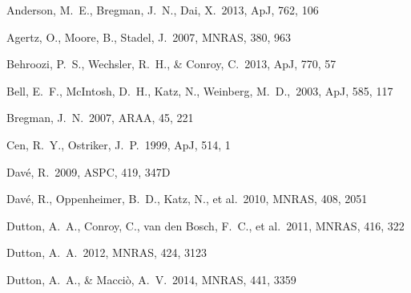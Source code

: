 \documentclass[useAMS,usenatbib]{mn2e}
\def \apj {ApJ}
\def \mnras {MNRAS}
\begin{document}
\begin{thebibliography}{}


 Anderson, M.~E., Bregman, J.~N., Dai, X.\ 2013, \apj, 762, 106

 Agertz, O., Moore, B., Stadel, J.\ 2007, \mnras, 380, 963


 Behroozi, P.~S.,
  Wechsler, R.~H., \& Conroy, C.\ 2013, \apj, 770, 57

 Bell, E.~F., McIntosh, D.~H., Katz, N., Weinberg, M.~D.,\ 2003, \apj, 585, 117

Bregman, J.~N.\ 2007, ARAA, 45, 221


Cen, R.~Y., Ostriker, J.~P.\ 1999, \apj, 514, 1



 Dav{\'e}, R.\ 2009, ASPC, 419, 347D

 Dav{\'e}, R., Oppenheimer, B.~D., Katz, N., et al.\ 2010, \mnras, 408, 2051

 Dutton, A.~A., Conroy, 
  C., van den Bosch, F.~C., et al.\ 2011, \mnras, 416, 322
  
 Dutton, A.~A.\ 2012,
  \mnras, 424, 3123
  
 Dutton,
  A.~A., \& Macci{\`o}, A.~V.\ 2014, \mnras, 441, 3359 



\end{thebibliography}
\end{document}
